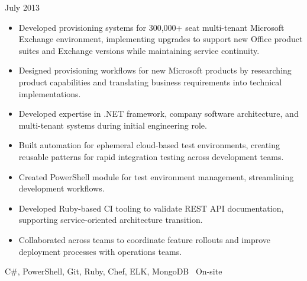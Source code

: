 \begin{experiences}
  {July 2013}        {
                      \begin{itemize}
                        \item Developed provisioning systems for 300,000+ seat
                              multi-tenant Microsoft Exchange environment, implementing
                              upgrades to support new Office product suites and Exchange
                              versions while maintaining service continuity.
                        \item Designed provisioning workflows for new Microsoft products
                              by researching product capabilities and translating
                              business requirements into technical implementations.
                        \ifcv
                        \item Developed expertise in .NET framework, company software
                              architecture, and multi-tenant systems during initial
                              engineering role.
                        \item Built automation for ephemeral cloud-based test
                              environments, creating reusable patterns for rapid
                              integration testing across development teams.
                        \item Created PowerShell module for test environment management,
                              streamlining development workflows.
                        \item Developed Ruby-based CI tooling to validate REST API
                              documentation, supporting service-oriented architecture
                              transition.
                        \item Collaborated across teams to coordinate feature rollouts
                              and improve deployment processes with operations teams.
                        \fi
                      \end{itemize}
                    }
                    {C\#, PowerShell, Git, Ruby, Chef, ELK, MongoDB}
                    {\faBuilding\ On-site}
\end{experiences}
